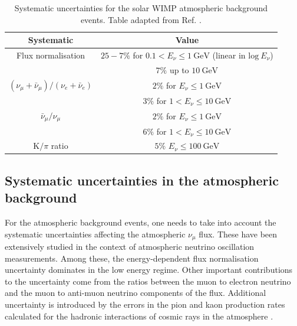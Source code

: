 \begin{table}[t]
	\caption[Systematic uncertainties for the solar WIMP atmospheric background events.]{Systematic uncertainties for the solar WIMP atmospheric background events. Table adapted from Ref. \cite{Super-Kamiokande2017}.}
	\begin{center}
		\begin{small}
			\begin{tabular}{c|c}
				Systematic                                            & Value \\[2mm] \hline
				\rule{0pt}{1.1\normalbaselineskip}Flux normalisation                                    & $25-7\%$ for $0.1 < E_{\nu} \leq 1~\mathrm{GeV}$ (linear in $\mathrm{log} ~ E_{\nu}$)\\[1mm] & $7\%$ up to $10~\mathrm{GeV}$ \\[2mm]
				$(\nu_{\mu}+\bar{\nu}_{\mu})/(\nu_{e}+\bar{\nu}_{e})$ & $2\%$ for $E_{\nu} \leq 1~\mathrm{GeV}$ \\[1mm] & $3\%$ for $1 < E_{\nu} \leq 10~\mathrm{GeV}$ \\[2mm]
				$\bar{\nu}_{\mu}/\nu_{\mu}$                           & $2\%$ for $E_{\nu} \leq 1~\mathrm{GeV}$ \\[1mm] & $6\%$ for $1 < E_{\nu} \leq 10~\mathrm{GeV}$ \\[2mm]
				$\mathrm{K}/\pi$ ratio                                & $5\%$ $E_{\nu} \leq 100~\mathrm{GeV}$
			\end{tabular}
		\end{small}
	\end{center}
	\label{tab:solar_dm_background_uncertainties}
\end{table}

\subsection{Systematic uncertainties in the atmospheric background}

For the atmospheric background events, one needs to take into account the systematic uncertainties affecting the atmospheric $\nu_{\mu}$ flux. These have been extensively studied in the context of atmospheric neutrino oscillation measurements. Among these, the energy-dependent flux normalisation uncertainty dominates in the low energy regime. Other important contributions to the uncertainty come from the ratios between the muon to electron neutrino and the muon to anti-muon neutrino components of the flux. Additional uncertainty is introduced by the errors in the pion and kaon production rates calculated for the hadronic interactions of cosmic rays in the atmosphere \cite{Honda2006}.

